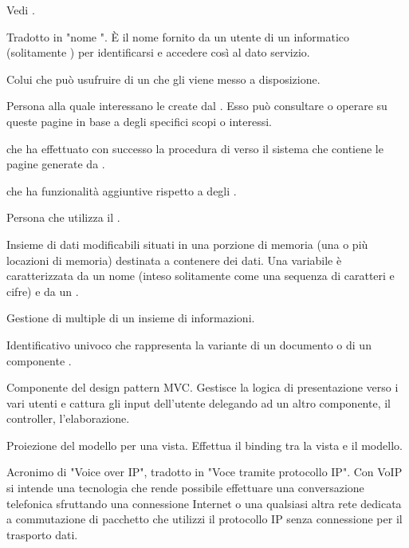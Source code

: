 {Vedi .}

{Tradotto in "nome ". \`{E} il nome fornito da un utente di un  informatico (solitamente ) per identificarsi e accedere così al dato servizio.}

{Colui che può usufruire di un  che gli viene messo a disposizione.}

{Persona alla quale interessano le  create dal  . Esso può consultare o operare su queste pagine in base a degli specifici scopi o interessi.}

{ che ha effettuato con successo la procedura di  verso il sistema che contiene le pagine generate da .}

{ che ha funzionalità aggiuntive rispetto a degli .}

{Persona che utilizza il  .}




{Insieme di dati modificabili situati in una porzione di memoria (una o più locazioni di memoria) destinata a contenere dei dati. Una variabile è caratterizzata da un nome (inteso solitamente come una sequenza di caratteri e cifre) e da un .}

{Gestione di  multiple di un insieme di informazioni.}

{Identificativo univoco che rappresenta la variante di un documento o di un componente .}

{Componente del design pattern MVC. Gestisce la logica di presentazione verso i vari utenti e cattura gli input dell'utente delegando ad un altro componente, il controller, l'elaborazione.}

{Proiezione del modello per una vista. Effettua il binding tra la vista e il modello.}

{Acronimo di "Voice over IP", tradotto in "Voce tramite protocollo IP". Con VoIP si intende una tecnologia che rende possibile effettuare una conversazione telefonica sfruttando una connessione Internet o una qualsiasi altra rete dedicata a commutazione di pacchetto che utilizzi il protocollo IP senza connessione per il trasporto dati.}


